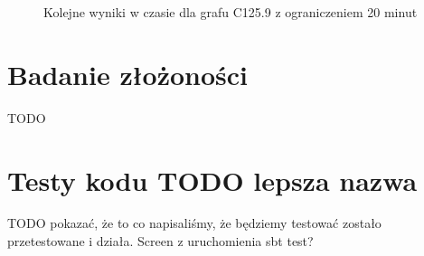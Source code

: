 \documentclass[12pt, a4paper]{article}
\begin{document}
\begin{figure}[H]
  \begin{center}
  \end{center}
  \caption{Kolejne wyniki w czasie dla grafu C125.9 z ograniczeniem 20 minut}
  \label{fig:ProgressC125.9-20min}
\end{figure}

\section{Badanie złożoności}

TODO

\section{Testy kodu TODO lepsza nazwa}

TODO pokazać, że to co napisaliśmy, że będziemy testować zostało przetestowane i działa. Screen z uruchomienia sbt test?


\nocite{*}


\end{document}
